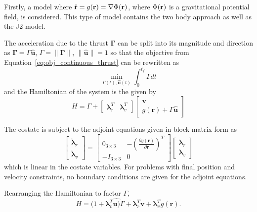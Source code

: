 Firstly, a model where \(\ddot{\mathbf{r}} = g(\mathbf{r}) = \nabla \Phi(\mathbf{r})\), where \(\Phi(\mathbf{r})\) is a gravitational potential field, is considered. This type of model contains the two body approach as well as the J2 model. 

The acceleration due to the thrust \(\mathbf{\Gamma} \) can be split into its magnitude and direction as \(\mathbf{\Gamma} = \Gamma \hat{\mathbf{u}}\), \(\Gamma = \lVert \mathbf{\Gamma} \rVert\), \(\lVert \hat{\mathbf{u}} \rVert = 1\) so that the objective from Equation~\eqref{eq:obj_continuous_thrust} can be rewritten as
\begin{equation}
    \min_{\Gamma(t), \hat{\mathbf{u}}(t)} \int_0^{t_f} \Gamma dt
\end{equation}
and the Hamiltonian of the system is the given by
\begin{equation}
    H = \Gamma + \begin{bmatrix}
        \mathbf{\lambda}_r^T & \mathbf{\lambda}_v^T
    \end{bmatrix} \begin{bmatrix}
        \mathbf{v} \\ g(\mathbf{r}) + \Gamma \hat{\mathbf{u}}
    \end{bmatrix}
\end{equation}

The costate is subject to the adjoint equations given in block matrix form as
\begin{equation}\label{eq:lambda_dot_cons}
    \begin{bmatrix}
        \dot{\mathbf{\lambda}}_r \\ \dot{\mathbf{\lambda}}_v
    \end{bmatrix} = \begin{bmatrix}
        0_{3\times3} & -\left(\frac{\partial g(\mathbf{r})}{\partial \mathbf{r}}\right)^T \\
        -I_{3\times3} & 0
    \end{bmatrix} \begin{bmatrix}
        \mathbf{\lambda}_r \\ \mathbf{\lambda}_v
    \end{bmatrix}
\end{equation}
which is linear in the costate variables. For problems with final position and velocity constraints, no boundary conditions are given for the adjoint equations.

Rearranging the Hamiltonian to factor \(\Gamma \), 
\begin{equation}
    H = (1 + \mathbf{\lambda}_v^T \hat{\mathbf{u})} \Gamma + \mathbf{\lambda}_r^T \mathbf{v} + \mathbf{\lambda}_v^T g(\mathbf{r}).
\end{equation}


